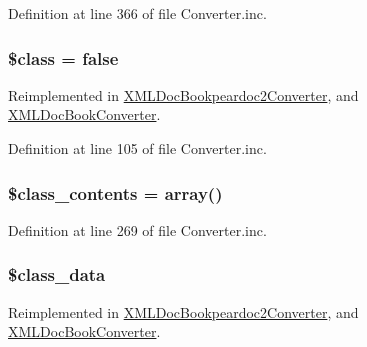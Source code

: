 \-Definition at line 366 of file \-Converter.\-inc.

\hypertarget{class_converter_a252ba022809910ea710a068fc1bab657}{
\subsubsection[{\$class}]{\setlength{\rightskip}{0pt plus 5cm}\$class = false}}\label{class_converter_a252ba022809910ea710a068fc1bab657}


\-Reimplemented in \hyperlink{class_x_m_l_doc_bookpeardoc2_converter_a252ba022809910ea710a068fc1bab657}{\-X\-M\-L\-Doc\-Bookpeardoc2\-Converter}, and \hyperlink{class_x_m_l_doc_book_converter_a252ba022809910ea710a068fc1bab657}{\-X\-M\-L\-Doc\-Book\-Converter}.



\-Definition at line 105 of file \-Converter.\-inc.

\hypertarget{class_converter_a2673a6f968cf40435ee37f829caaa0e3}{
\subsubsection[{\$class\-\_\-contents}]{\setlength{\rightskip}{0pt plus 5cm}\$class\-\_\-contents = array()}}\label{class_converter_a2673a6f968cf40435ee37f829caaa0e3}


\-Definition at line 269 of file \-Converter.\-inc.

\hypertarget{class_converter_afdb3770ba45b6d4db2c00c8c18832482}{
\subsubsection[{\$class\-\_\-data}]{\setlength{\rightskip}{0pt plus 5cm}\$class\-\_\-data}}\label{class_converter_afdb3770ba45b6d4db2c00c8c18832482}


\-Reimplemented in \hyperlink{class_x_m_l_doc_bookpeardoc2_converter_afdb3770ba45b6d4db2c00c8c18832482}{\-X\-M\-L\-Doc\-Bookpeardoc2\-Converter}, and \hyperlink{class_x_m_l_doc_book_converter_afdb3770ba45b6d4db2c00c8c18832482}{\-X\-M\-L\-Doc\-Book\-Converter}.



